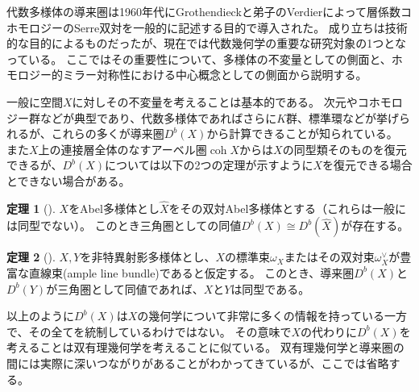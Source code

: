 \documentclass[uplatex,a4paper,dvipdfmx]{jsarticle}
\numberwithin{equation}{section}
\theoremstyle{definition}
\newtheorem{theorem}{定理}[section]
\DeclareMathOperator{\coh}{\mathrm{coh}}
\begin{document}
代数多様体の導来圏は1960年代にGrothendieckと弟子のVerdierによって層係数コホモロジーのSerre双対を一般的に記述する目的で導入された。
成り立ちは技術的な目的によるものだったが、現在では代数幾何学の重要な研究対象の1つとなっている。
ここではその重要性について、多様体の不変量としての側面と、ホモロジー的ミラー対称性における中心概念としての側面から説明する。

一般に空間$X$に対しその不変量を考えることは基本的である。
次元やコホモロジー群などが典型であり、代数多様体であればさらに$K$群、標準環などが挙げられるが、これらの多くが導来圏$D^b(X)$から計算できることが知られている。
また$X$上の連接層全体のなすアーベル圏$\coh X$からは$X$の同型類そのものを復元できるが、$D^b(X)$については以下の2つの定理が示すように$X$を復元できる場合とできない場合がある。
\begin{theorem}[\cite{MR607081}]\label{mukai}
	$X$をAbel多様体とし$\hat{X}$をその双対Abel多様体とする（これらは一般には同型でない）。
	このとき三角圏としての同値$D^b(X) \cong D^b(\hat{X})$が存在する。
\end{theorem}
\begin{theorem}[\cite{MR1818984}]
	$X, Y$を非特異射影多様体とし、$X$の標準束$\omega_X$またはその双対束$\omega_X^\vee$が豊富な直線束(ample line bundle)であると仮定する。
	このとき、導来圏$D^b(X)$と$D^b(Y)$が三角圏として同値であれば、$X$と$Y$は同型である。
\end{theorem}
以上のように$D^b(X)$は$X$の幾何学について非常に多くの情報を持っている一方で、その全てを統制しているわけではない。
その意味で$X$の代わりに$D^b(X)$を考えることは双有理幾何学を考えることに似ている。
双有理幾何学と導来圏の間には実際に深いつながりがあることがわかってきているが、ここでは省略する。
\end{document}
